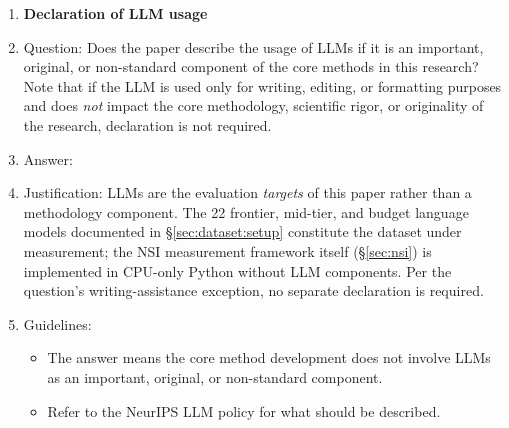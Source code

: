 \begin{enumerate}
\item {\bf Declaration of LLM usage}
    \item[] Question: Does the paper describe the usage of LLMs if it is an important, original, or non-standard component of the core methods in this research? Note that if the LLM is used only for writing, editing, or formatting purposes and does \emph{not} impact the core methodology, scientific rigor, or originality of the research, declaration is not required.
    \item[] Answer: \answerNA{}
    \item[] Justification: LLMs are the evaluation \emph{targets} of this paper rather than a methodology component. The 22 frontier, mid-tier, and budget language models documented in \S\ref{sec:dataset:setup} constitute the dataset under measurement; the NSI measurement framework itself (\S\ref{sec:nsi}) is implemented in CPU-only Python without LLM components. Per the question's writing-assistance exception, no separate declaration is required.
    \item[] Guidelines:
    \begin{itemize}
        \item The answer \answerNA{} means the core method development does not involve LLMs as an important, original, or non-standard component.
        \item Refer to the NeurIPS LLM policy for what should be described.
    \end{itemize}

\end{enumerate}
